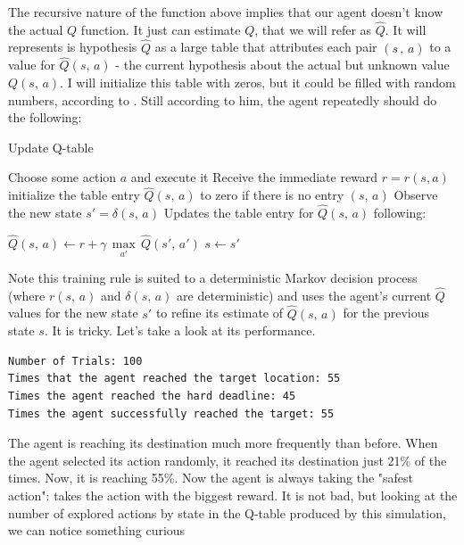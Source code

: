 \documentclass[a4paper]{article}
\begin{document}
The recursive nature of the function above implies that our agent doesn't know the actual $Q$ function. It just can estimate $Q$, that we will refer as $\hat{Q}$. It will represents is hypothesis $\hat{Q}$ as a large table that attributes each pair $(s\, , \, a)$ to a value for $\hat{Q}(s,\, a)$ - the current hypothesis about the actual but unknown value $Q(s, \, a)$. I will initialize this table with zeros, but it could be filled with random numbers, according to \cite{Mitchell}. Still according to him, the agent repeatedly should do the following:

\begin{algorithm}
\caption{Update Q-table}\label{alg:qtable}
\begin{algorithmic}[1]
  \State Choose some action $a$ and execute it
  \State Receive the immediate reward $r = r(s, a)$
  \State initialize the table entry $\hat{Q}(s, \, a)$ to zero if there is no entry $(s, \, a)$
  \State Observe the new state $s' = \delta(s, \,a)$
  \State Updates the table entry for $\hat{Q}(s, \, a)$ following:

    \do $\hat{Q}(s, \, a) \leftarrow r + \gamma \, \underset{a'}{\max}\, \hat{Q}(s', \, a')$
  \State $s \leftarrow s'$
\EndLoop
\end{algorithmic}
\end{algorithm}

Note this training rule is suited to a deterministic Markov decision process (where $r(s,\, a)$ and $\delta(s,\, a)$ are deterministic) and uses the agent's current $\hat{Q}$ values for the new state $s'$ to refine its estimate of $\hat{Q}(s, \,a)$ for the previous state $s$. It is tricky. Let's take a look at its performance.

\begin{lstlisting}
Number of Trials: 100
Times that the agent reached the target location: 55
Times the agent reached the hard deadline: 45
Times the agent successfully reached the target: 55
\end{lstlisting}

The agent is reaching its destination much more frequently than before. When the agent selected its action randomly, it reached its destination just 21\% of the times. Now, it is reaching 55\%. Now the agent is always taking the "safest action":  takes the action with the biggest reward. It is not bad, but looking at the number of explored actions by state in the Q-table produced by this simulation, we can notice something curious
\end{document}
